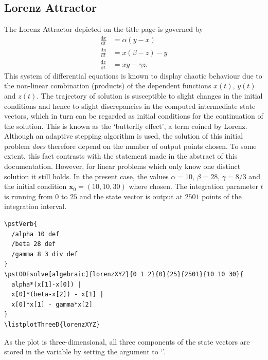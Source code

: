 \documentclass[
  fontsize=11pt,
  english,
  BCOR=10mm,DIV=12,
  bibliography=totoc,
  parskip=false,
  headings=small,
  headinclude=false,
  footinclude=false,
  twoside=false,
  UKenglish
]{pst-doc}
\begin{document}
\subsection[Lorenz Attractor]{Lorenz Attractor }
The Lorenz Attractor depicted on the title page is governed by
\begin{align*}
  \frac{\mathrm{d}x}{\mathrm{d}t}& = \alpha (y-x)\\
  \frac{\mathrm{d}y}{\mathrm{d}t}& = x(\beta-z)-y\\
  \frac{\mathrm{d}z}{\mathrm{d}t}& = x y - \gamma z.
\end{align*}
This system of differential equations is known to display chaotic behaviour due to the non-linear combination (products) of the dependent functions $x(t)$, $y(t)$ and $z(t)$. The trajectory of solution is susceptible to slight changes in the initial conditions and hence to slight discrepancies in the computed intermediate state vectors, which in turn can be regarded as initial conditions for the continuation of the solution. This is known as the `butterfly effect', a term coined by Lorenz. Although an adaptive stepping algorithm is used, the solution of this initial problem \emph{does} therefore depend on the number of output points chosen. To some extent, this fact contrasts with the statement made in the abstract of this documentation. However, for linear problems which only know one distinct solution it still holds. In the present case, the values $\alpha=10$, $\beta=28$, $\gamma=8/3$ and the initial condition $\mathbf{x}_0=(10,10,30)$ where chosen. The integration parameter $t$ is running from  $0$ to $25$ and the state vector is output at $2501$ points of the integration interval.

\begin{verbatim}
\pstVerb{
  /alpha 10 def
  /beta 28 def
  /gamma 8 3 div def
}
\pstODEsolve[algebraic]{lorenzXYZ}{0 1 2}{0}{25}{2501}{10 10 30}{
  alpha*(x[1]-x[0]) |
  x[0]*(beta-x[2]) - x[1] |
  x[0]*x[1] - gamma*x[2]
}
\listplotThreeD{lorenzXYZ}
\end{verbatim}
As the plot is three-dimensional, all three components of the state vectors are stored in the \PS{} variable  by setting the  argument to `'.
\end{document}
